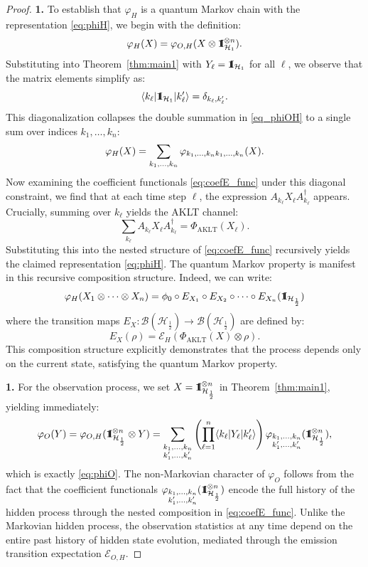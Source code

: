 \documentclass[12pt,a4paper]{article}
\def\id{{\bf 1}\!\!{\rm I}}
\begin{document}
\begin{proof}


\noindent\textbf{  1.} To establish that $\varphi_H$ is a quantum Markov chain with the representation \eqref{eq:phiH}, we begin with the definition:
\[
\varphi_H(X) = \varphi_{O,H}(X \otimes \id_{\mathcal{H}_{1}}^{\otimes n}).
\]
Substituting into Theorem~\ref{thm:main1} with $Y_\ell = \id_{\mathcal{H}_{1}}$ for all $\ell$, we observe that the matrix elements simplify as:
\[
\langle k_\ell | \id_{\mathcal{H}_{1}} | k'_\ell \rangle = \delta_{k_\ell, k'_\ell}.
\]
This diagonalization collapses the double summation in \eqref{eq_phiOH} to a single sum over indices $k_1, \dots, k_n$:
\[
\varphi_H(X) = \sum_{k_1,\dots,k_n} \varphi_{k_1,\dots,k_n \\ k_1,\dots,k_n}(X).
\]
Now examining the coefficient functionals \eqref{eq:coefE_func} under this diagonal constraint, we find that at each time step $\ell$, the expression $A_{k_\ell}X_\ell A_{k_\ell}^\dagger$ appears. Crucially, summing over $k_\ell$ yields the AKLT channel:
\[
\sum_{k_\ell} A_{k_\ell}X_\ell A_{k_\ell}^\dagger = \Phi_{\mathrm{AKLT}}(X_\ell).
\]
Substituting this into the nested structure of \eqref{eq:coefE_func} recursively yields the claimed representation \eqref{eq:phiH}.
The quantum Markov property is manifest in this recursive composition structure. Indeed, we can write:
\[
\varphi_H(X_1 \otimes \cdots \otimes X_n) = \phi_0 \circ E_{X_1} \circ E_{X_2} \circ \cdots \circ E_{X_n}(\id_{\mathcal{H}_{\frac{1}{2}}})
\]
where the transition maps $E_X: \mathcal{B}(\mathcal{H}_{\frac{1}{2}})\to \mathcal{B}(\mathcal{H}_{\frac{1}{2}})$ are defined by:
\[
E_X(\rho) = \mathcal{E}_H\left( \Phi_{\mathrm{AKLT}}(X) \otimes \rho \right).
\]
This composition structure explicitly demonstrates that the process depends only on the current state, satisfying the quantum Markov property.

\noindent\textbf{1.} For the observation process, we set $X = \id_{\mathcal{H}_{\frac{1}{2}}}^{\otimes n}$ in Theorem~\ref{thm:main1}, yielding immediately:
\[
\varphi_O(Y) = \varphi_{O,H}(\id_{\mathcal{H}_{\frac{1}{2}}}^{\otimes n} \otimes Y) = \sum_{\substack{k_1,\dots,k_n \\ k'_1,\dots,k'_n}} \left( \prod_{\ell=1}^n \langle k_\ell | Y_\ell | k'_\ell \rangle \right) \varphi_{\substack{k_1,\dots,k_n \\ k'_1,\dots,k'_n}}(\id_{\mathcal{H}_{\frac{1}{2}}}^{\otimes n}),
\]
which is exactly \eqref{eq:phiO}. The non-Markovian character of $\varphi_O$ follows from the fact that the coefficient functionals $\varphi_{\substack{k_1,\dots,k_n \\ k'_1,\dots,k'_n}}(\id_{\mathcal{H}_{\frac{1}{2}}}^{\otimes n})$ encode the full history of the hidden process through the nested composition in \eqref{eq:coefE_func}. Unlike the Markovian hidden process, the observation statistics at any time depend on the entire past history of hidden state evolution, mediated through the emission transition expectation $\mathcal{E}_{O,H}$.
\end{proof}
\end{document}
